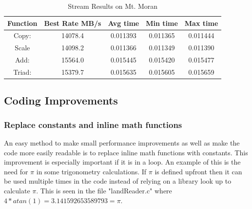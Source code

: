 \documentclass[]{article}%
\begin{document}
\begin{table}[ht]
\caption{Stream Results on Mt. Moran}
\centering
\begin{tabular}{c c  c c c}
\hline\hline
\hline
Function   & Best Rate MB/s & Avg time  &   Min time &    Max time \\ [0.5ex] 
\hline

Copy:    &     14078.4    & 0.011393    & 0.011365     & 0.011444\\
Scale     &  14098.2    & 0.011366     & 0.011349    & 0.011390\\
Add:      & 15564.0    & 0.015445     & 0.015420     & 0.015477\\
Triad:    & 15379.7    & 0.015635     & 0.015605     & 0.015659\\

\hline
\end{tabular}
\label{table:STREAM}
\end{table} 


\subsection{Coding Improvements}

\subsubsection{Replace constants and inline math functions}

An easy method to make small performance improvements as well as make the code more easily readable is to replace inline math functions with constants. This improvement is especially important if it is in a loop. An example of this is the need for $\pi$ in some trigonometry calculations. If $\pi$ is defined upfront then it can be used multiple times in the code instead of relying on a library look up to calculate $\pi$. This is seen in the file "landReader.c" where $4*atan(1) = 3.141592653589793 = \pi$.

\end{document}
